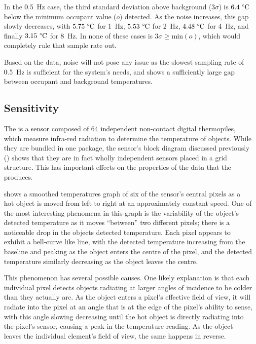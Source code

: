 \documentclass[../thesis/thesis.tex]{subfiles}
\begin{document}
In the 0.5~Hz case, the third standard deviation above background ($3\sigma$) is $6.4~\degree\textrm{C}$ below the minimum occupant value ($o$) detected. As the noise increases, this gap slowly decreases, with $5.75~\degree\textrm{C}$ for 1~Hz, $5.53~\degree\textrm{C}$ for 2~Hz, $4.48~\degree\textrm{C}$ for 4~Hz, and finally $3.15~\degree\textrm{C}$ for 8~Hz. In none of these cases is $3\sigma \ge \mathrm{min}(o)$, which would completely rule that sample rate out.

Based on the data, noise will not pose any issue as the slowest sampling rate of 0.5~Hz is sufficient for the system's needs, and shows a sufficiently large gap between occupant and background temperatures.

\subsection{Sensitivity}
\label{subsec:sensitivity}

The \mlx is a sensor composed of 64 independent non-contact digital thermopiles, which measure infra-red radiation to determine the temperature of objects. While they are bundled in one package, the sensor's block diagram discussed previously () shows that they are in fact wholly independent sensors placed in a grid structure. This has important effects on the properties of the data that the \mlx produces. 

 shows a smoothed temperatures graph of six of the sensor's central pixels as a hot object is moved from left to right at an approximately constant speed. One of the most interesting phenomena in this graph is the variability of the object's detected temperature as it moves ``between'' two different pixels; there is a noticeable drop in the objects detected temperature. Each pixel appears to exhibit a bell-curve like line, with the detected temperature increasing from the baseline and peaking as the object enters the centre of the pixel, and the detected temperature similarly decreasing as the object leaves the centre. 

This phenomenon has several possible causes. One likely explanation is that each individual pixel detects objects radiating at larger angles of incidence to be colder than they actually are. As the object enters a pixel's effective field of view, it will radiate into the pixel at an angle that is at the edge of the pixel's ability to sense, with this angle slowing decreasing until the hot object is directly radiating into the pixel's sensor, causing a peak in the temperature reading. As the object leaves the individual element's field of view, the same happens in reverse.
\end{document}
